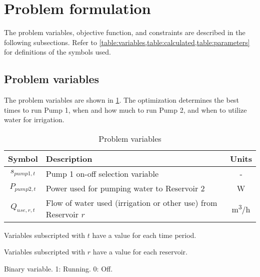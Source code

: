 \section{Problem formulation}
\label{sec:problem-formulation}

The problem variables, objective function, and constraints are described in the following subsections. Refer to \cref{table:variables,table:calculated,table:parameters} for definitions of the symbols used.

\subsection{Problem variables}

The problem variables are shown in \cref{table:variables}. The optimization determines the best times to run Pump 1, when and how much to run Pump 2, and when to utilize water for irrigation.

\begin{table}[t]
	\begin{threeparttable}[b]
		\caption{Problem variables}
		\label{table:variables}
		\begin{tabular}{cp{}c}
			\toprule 
			Symbol & Description & Units \\
			\midrule
			$s_{pump1,t}$ & Pump 1 on-off selection variable\tnote{3} & - \\
			$P_{pump2,t}$ & Power used for pumping water to Reservoir 2 & \si{W} \\
			$Q_{use,r,t}$ & Flow of water used (irrigation or other use) from Reservoir $r$ & \si{m^3/h} \\
			\bottomrule
		\end{tabular}
		\begin{tablenotes}
			\footnotesize
			\item [1] Variables subscripted with $t$ have a value for each time period.
			\item [2] Variables subscripted with $r$ have a value for each reservoir.
			\item [3] Binary variable. 1: Running. 0: Off.
		\end{tablenotes}
	\end{threeparttable}
\end{table}


